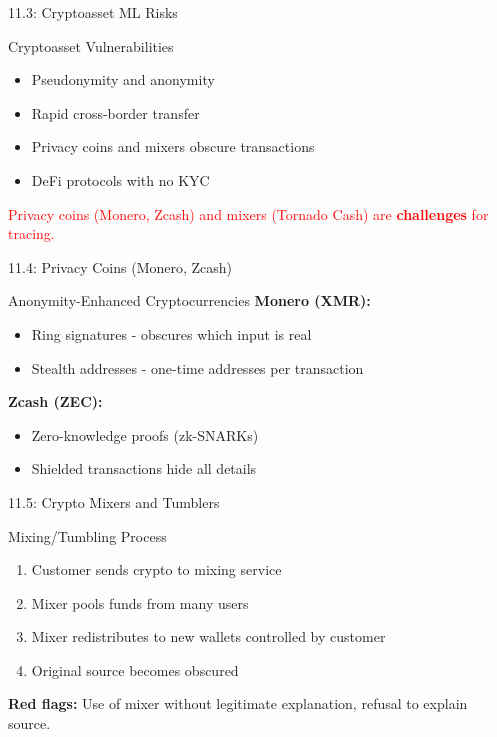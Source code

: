 \documentclass{beamer}
\begin{document}
	\begin{frame}{11.3: Cryptoasset ML Risks}
		\begin{block}{Cryptoasset Vulnerabilities}
			\begin{itemize}
				\item Pseudonymity and anonymity
				\item Rapid cross-border transfer
				\item Privacy coins and mixers obscure transactions
				\item DeFi protocols with no KYC
			\end{itemize}
		\end{block}
		\textcolor{red}{Privacy coins (Monero, Zcash) and mixers (Tornado Cash) are \textbf{challenges} for tracing.}
	\end{frame}
	
	\begin{frame}{11.4: Privacy Coins (Monero, Zcash)}
		\begin{block}{Anonymity-Enhanced Cryptocurrencies}
			\textbf{Monero (XMR):}
			\begin{itemize}
				\item Ring signatures - obscures which input is real
				\item Stealth addresses - one-time addresses per transaction
			\end{itemize}
			\textbf{Zcash (ZEC):}
			\begin{itemize}
				\item Zero-knowledge proofs (zk-SNARKs)
				\item Shielded transactions hide all details
			\end{itemize}
		\end{block}
	\end{frame}
	
	\begin{frame}{11.5: Crypto Mixers and Tumblers}
		\begin{block}{Mixing/Tumbling Process}
			\begin{enumerate}
				\item Customer sends crypto to mixing service
				\item Mixer pools funds from many users
				\item Mixer redistributes to new wallets controlled by customer
				\item Original source becomes obscured
			\end{enumerate}
		\end{block}
		\textbf{Red flags:} Use of mixer without legitimate explanation, refusal to explain source.
	\end{frame}
	
\end{document}
